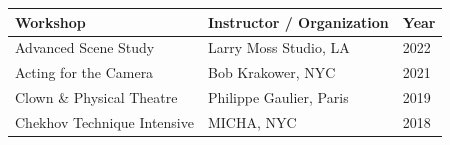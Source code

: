 \documentclass[11pt,letterpaper]{article}
\begin{document}
\begin{minipage}[t]{0.63\textwidth}
  {\footnotesize
  \begin{tabularx}{\linewidth}{@{}P{3.4cm} Z P{2.5cm}@{}}
    \toprule
    \textbf{Workshop} & \textbf{Instructor / Organization} & \textbf{Year} \\
    \midrule
    Advanced Scene Study & Larry Moss Studio, LA & 2022 \\
    Acting for the Camera & Bob Krakower, NYC & 2021 \\
    Clown \& Physical Theatre & Philippe Gaulier, Paris & 2019 \\
    Chekhov Technique Intensive & MICHA, NYC & 2018 \\
    \bottomrule
  \end{tabularx}}
\end{minipage}\par
\end{document}
